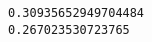 \documentclass[11pt]{article}
\begin{document}
    \begin{Verbatim}[commandchars=\\\{\}]
0.30935652949704484
0.267023530723765

    \end{Verbatim}


    
    
    
    
\end{document}
